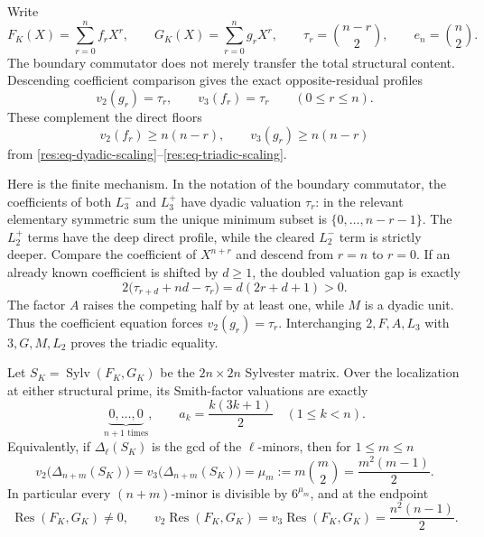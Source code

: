 \documentclass[11pt,oneside]{article}
\theoremstyle{definition}
\theoremstyle{remark}
\begin{document}
Write
\[
 F_K(X)=\sum_{r=0}^{n}f_rX^r,\qquad
 G_K(X)=\sum_{r=0}^{n}g_rX^r,\qquad
 \tau_r=\binom{n-r}{2},\qquad e_n=\binom n2.
\]
The boundary commutator does not merely transfer the total structural content.  Descending
coefficient comparison gives the exact opposite-residual profiles
\begin{equation}
 v_2(g_r)=\tau_r,\qquad v_3(f_r)=\tau_r
 \qquad(0\le r\le n).
 \label{res:eq-opposite-residual-profile}
\end{equation}
These complement the direct floors
\[
 v_2(f_r)\ge n(n-r),\qquad v_3(g_r)\ge n(n-r)
\]
from \eqref{res:eq-dyadic-scaling}--\eqref{res:eq-triadic-scaling}.

Here is the finite mechanism.  In the notation of the boundary commutator, the coefficients
of both $L_3^-$ and $L_3^+$ have dyadic valuation $\tau_r$: in the relevant elementary
symmetric sum the unique minimum subset is $\{0,\ldots,n-r-1\}$.  The $L_2^+$ terms have the
deep direct profile, while the cleared $L_2^-$ term is strictly deeper.  Compare the
coefficient of $X^{n+r}$ and descend from $r=n$ to $r=0$.  If an already known coefficient is
shifted by $d\ge1$, the doubled valuation gap is exactly
\begin{equation}
 2\bigl(\tau_{r+d}+nd-\tau_r\bigr)=d(2r+d+1)>0.
 \label{res:eq-cross-profile-gap}
\end{equation}
The factor $A$ raises the competing half by at least one, while $M$ is a dyadic unit.  Thus
the coefficient equation forces $v_2(g_r)=\tau_r$.  Interchanging $2,F,A,L_3$ with
$3,G,M,L_2$ proves the triadic equality.

Let $S_K=\operatorname{Sylv}(F_K,G_K)$ be the $2n\times2n$ Sylvester matrix.  Over the
localization at either structural prime, its Smith-factor valuations are exactly
\begin{equation}
 \underbrace{0,\ldots,0}_{n+1\text{ times}},\qquad
 a_k=\frac{k(3k+1)}2\quad(1\le k<n).
 \label{res:eq-cross-smith-profile}
\end{equation}
Equivalently, if $\Delta_\ell(S_K)$ is the gcd of the $\ell$-minors, then for
$1\le m\le n$
\begin{equation}
 v_2\bigl(\Delta_{n+m}(S_K)\bigr)
 =v_3\bigl(\Delta_{n+m}(S_K)\bigr)
 =\mu_m:=m\binom m2=\frac{m^2(m-1)}2.
 \label{res:eq-cross-determinantal-divisors}
\end{equation}
In particular every $(n+m)$-minor is divisible by $6^{\mu_m}$, and at the endpoint
\begin{equation}
 \operatorname{Res}(F_K,G_K)\ne0,\qquad
 v_2\operatorname{Res}(F_K,G_K)
 =v_3\operatorname{Res}(F_K,G_K)
 =\frac{n^2(n-1)}2.
 \label{res:eq-cross-resultant-exact}
\end{equation}
\end{document}
